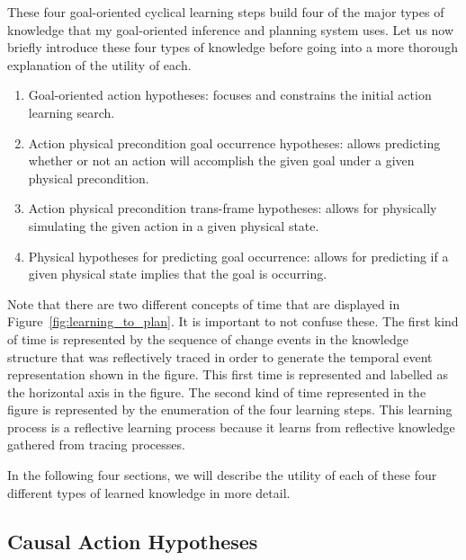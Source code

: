 These four goal-oriented cyclical learning steps build four of the
major types of knowledge that my goal-oriented inference and planning
system uses.  Let us now briefly introduce these four types of
knowledge before going into a more thorough explanation of the utility
of each.

\begin{enumerate}

\item{Goal-oriented action hypotheses: focuses and constrains the
  initial action learning search.}

\item{Action physical precondition goal occurrence hypotheses: allows
  predicting whether or not an action will accomplish the given goal
  under a given physical precondition.}

\item{Action physical precondition trans-frame hypotheses: allows for
  physically simulating the given action in a given physical state.}

\item{Physical hypotheses for predicting goal occurrence: allows for
  predicting if a given physical state implies that the goal is
  occurring.}

\end{enumerate}

Note that there are two different concepts of time that are displayed
in Figure~\ref{fig:learning_to_plan}.  It is important to not confuse
these.  The first kind of time is represented by the sequence of
change events in the knowledge structure that was reflectively traced
in order to generate the temporal event representation shown in the
figure.  This first time is represented and labelled as the horizontal
axis in the figure.  The second kind of time represented in the figure
is represented by the enumeration of the four learning steps.  This
learning process is a reflective learning process because it learns
from reflective knowledge gathered from tracing processes.

In the following four sections, we will describe the utility of each
of these four different types of learned knowledge in more detail.

\subsection{Causal Action Hypotheses}
\label{sec:goal_oriented_action_hypotheses}

